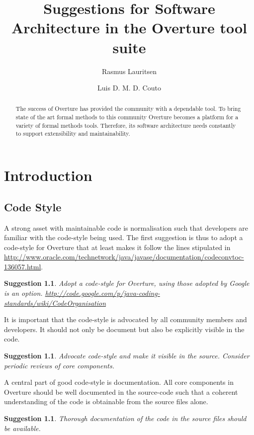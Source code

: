 \documentclass{overturerep}
\title{Suggestions for Software Architecture in the Overture tool suite}
\author{Rasmus Lauritsen \and Luis D. M. D. Couto}
\newtheorem{sug}[subsection]{Suggestion}
\begin{document}
\maketitle

\begin{abstract}
  The success of Overture has provided the community with a dependable
  tool. To bring state of the art formal methods to this community
  Overture becomes a platform for a variety of formal methods tools.
  Therefore, its software architecture needs constantly to support
  extensibility and maintainability.
\end{abstract}

\chapter{Introduction}

\section{Code Style}
A strong asset with maintainable code is normalisation such that
developers are familiar with the code-style being used. The first
suggestion is thus to adopt a code-style for Overture that at least
makes it follow the lines stipulated in
\url{http://www.oracle.com/technetwork/java/javase/documentation/codeconvtoc-136057.html}.

\begin{sug}
  Adopt a code-style for Overture, using those adopted by Google is an
  option.
  \url{http://code.google.com/p/java-coding-standards/wiki/CodeOrganisation}
\end{sug}

It is important that the code-style is advocated by all community
members and developers. It should not only be document but also be
explicitly visible in the code.

\begin{sug}
  Advocate code-style and make it visible in the source. Consider
  periodic reviews of core components.
\end{sug}

A central part of good code-style is documentation. All core components
in Overture should be well documented in the source-code such that a
coherent understanding of the code is obtainable from the source files
alone.

\begin{sug}
Thorough documentation of the code in the source files should be available.
\end{sug}
\end{document}
